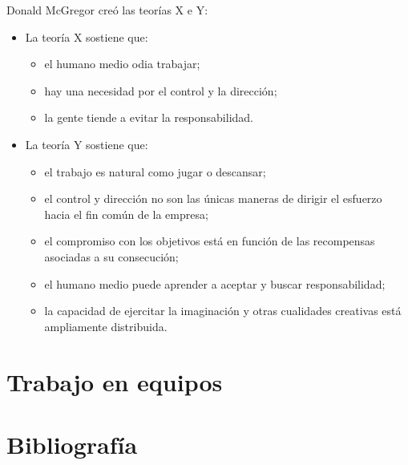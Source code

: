 \documentclass[12pt]{article}
\begin{document}
{Donald McGregor creó las teorías X e Y:}
\begin{itemize}
    \item {La teoría X sostiene que:}
    
    \begin{itemize}
        \item {el humano medio odia trabajar;}
        \item {hay una necesidad por el control y la dirección;}
        \item {la gente tiende a evitar la responsabilidad.}
    \end{itemize}
    
    \item {La teoría Y sostiene que:}
    
    \begin{itemize}
        \item {el trabajo es natural como jugar o descansar;}
        \item {el control y dirección no son las únicas maneras de dirigir el esfuerzo hacia el fin común de la empresa;}
        \item {el compromiso con los objetivos está en función de las recompensas asociadas a su consecución;}
        \item {el humano medio puede aprender a aceptar y buscar responsabilidad;}
        \item {la capacidad de ejercitar la imaginación y otras cualidades creativas está ampliamente distribuida.}
    \end{itemize}
    
\end{itemize}

\newpage
\section{Trabajo en equipos}
\label{12.0.0}


\newpage
\section{Bibliografía}
\label{bibliografia}
\nocite{*}
\begingroup
\renewcommand{\section}[2]{}%
\printbibliography
\endgroup
\end{document}
